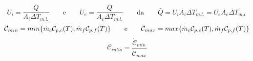 \documentclass[a4paper,10pt]{article}                                                                                       %
\begin{document}
\begin{equation}                                                                                                            %
  U_i = \frac{\bar{Q}}{A_i\Delta{T_{m.l.}}}                                                                                 %
  \qquad\text{e}\qquad                                                                                                      %
  U_e = \frac{\bar{Q}}{A_e\Delta{T_{m.l.}}}                                                                                 %
  \qquad\text{da}\qquad                                                                                                     %
  \bar{Q} = U_iA_i\Delta{T_{m.l.}} = U_eA_e\Delta{T_{m.l.}}                                                                 %
  \label{eqn:ghtc}                                                                                                          %
\end{equation}                                                                                                              %
\vspace{3mm}                                                                                                                %
\begin{equation}                                                                                                            %
  \mathcal{\dot{C}}_{min} = min\{\space\dot{m}_c\mathcal{C}_{p,c}(T),\space\dot{m}_f\mathcal{C}_{p,f}(T)\space\}            %
  \qquad\text{e}\qquad                                                                                                      %
  \mathcal{\dot{C}}_{max} = max\{\space\dot{m}_c\mathcal{C}_{p,c}(T),\space\dot{m}_f\mathcal{C}_{p,f}(T)\space\}            %
  \label{eqn:cpt}                                                                                                           %
\end{equation}                                                                                                              %
\vspace{3mm}                                                                                                                %
\begin{equation}                                                                                                            %
  \mathcal{\dot{C}}_{ratio} = \frac{\mathcal{\dot{C}}_{min}}{\mathcal{\dot{C}}_{max}}                                       %
  \label{eqn:cpt_r}                                                                                                         %
\end{equation}                                                                                                              %
\end{document}
